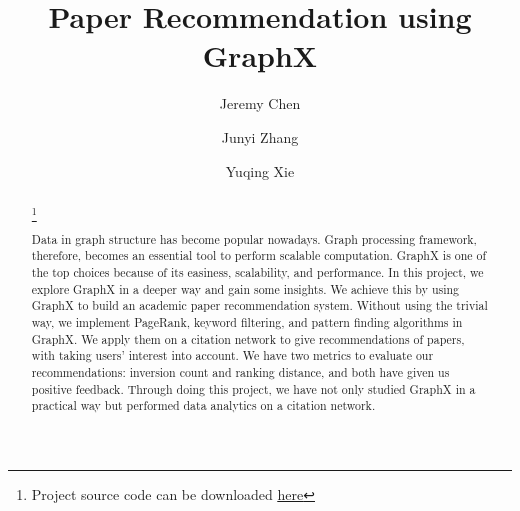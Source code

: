 \documentclass[sigconf]{acmart}
\newcommand\blfootnote[1]{%
  \begingroup
  \renewcommand\thefootnote{}\footnote{#1}%
  \addtocounter{footnote}{-1}%
  \endgroup
}
\begin{document}
\title{Paper Recommendation using GraphX} 

\author{Jeremy Chen}

\author{Junyi Zhang}

\author{Yuqing Xie}

\renewcommand\footnotetextcopyrightpermission[1]{}
\pagestyle{plain}


\begin{abstract} \blfootnote{Project source code can be downloaded \href{https://github.com/amyxie361/CS651\_Paper\_recommendation}{\underline{here}}}
Data in graph structure has become popular nowadays.
%
Graph processing framework, therefore, becomes an essential tool to perform scalable computation.
%
GraphX is one of the top choices because of its easiness, scalability, and performance.
%
In this project, we explore GraphX in a deeper way and gain some insights.
%
We achieve this by using GraphX to build an academic paper recommendation system.
%
Without using the trivial way, we implement PageRank, keyword filtering, and pattern finding algorithms in GraphX.
%
We apply them on a citation network to give recommendations of papers, with taking users' interest into account.
%
We have two metrics to evaluate our recommendations: inversion count and ranking distance, and both have given us positive feedback.
%
Through doing this project, we have not only studied GraphX in a practical way but performed data analytics on a citation network.
%
\end{abstract}

\maketitle 













\end{document}
